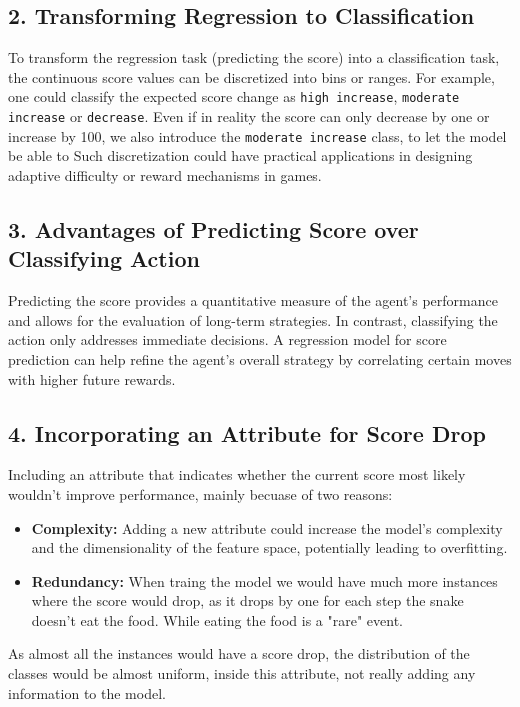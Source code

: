 \documentclass[12pt,a4paper]{article}
\begin{document}
\subsection*{2. Transforming Regression to Classification}
To transform the regression task (predicting the score) into a classification task, the continuous score values can be discretized into bins or ranges. 
For example, one could classify the expected score change as \texttt{high increase}, \texttt{moderate increase} or \texttt{decrease}. 
Even if in reality the score can only decrease by one or increase by 100, 
we also introduce the \texttt{moderate increase} class, to let the model be able to 
Such discretization could have practical applications in designing adaptive difficulty or reward mechanisms in games.

\subsection*{3. Advantages of Predicting Score over Classifying Action}
Predicting the score provides a quantitative measure of the agent’s performance and allows for the evaluation of long-term strategies. In contrast, classifying the action only addresses immediate decisions. A regression model for score prediction can help refine the agent’s overall strategy by correlating certain moves with higher future rewards.

\subsection*{4. Incorporating an Attribute for Score Drop}
Including an attribute that indicates whether the current score most likely  wouldn't improve performance, mainly becuase of two reasons:
\begin{itemize}
    \item \textbf{Complexity:} Adding a new attribute could increase the model's complexity and the dimensionality of the feature space, potentially leading to overfitting.
    \item \textbf{Redundancy:} When traing the model we would have much more instances where the score would drop, as it drops by one for each step the snake doesn't eat the food. While eating the food is a "rare" event.
\end{itemize}
As almost all the instances would have a score drop,
the distribution of the classes would be almost uniform, inside this attribute, not really adding any information to the model.
\end{document}
